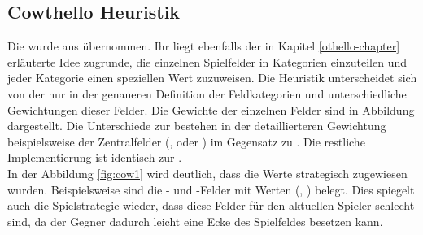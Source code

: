 \subsection{Cowthello Heuristik}
Die  wurde aus \cite{cow1} übernommen. Ihr liegt ebenfalls der in Kapitel \ref{othello-chapter} erläuterte Idee zugrunde, die einzelnen Spielfelder in Kategorien einzuteilen und jeder Kategorie einen speziellen Wert zuzuweisen. Die Heuristik unterscheidet sich von der  nur in der genaueren Definition der Feldkategorien und unterschiedliche Gewichtungen dieser Felder.
Die Gewichte der einzelnen Felder sind in Abbildung dargestellt. Die Unterschiede zur  bestehen in der detaillierteren Gewichtung beispielsweise der Zentralfelder (,  oder ) im Gegensatz zu . Die restliche Implementierung ist identisch zur .
\\
In der Abbildung \ref{fig:cow1} wird deutlich, dass die Werte strategisch zugewiesen wurden. Beispielsweise sind die - und -Felder mit  Werten (, ) belegt. Dies spiegelt auch die Spielstrategie wieder, dass diese Felder für den aktuellen Spieler schlecht sind, da der Gegner dadurch leicht eine Ecke des Spielfeldes besetzen kann.
